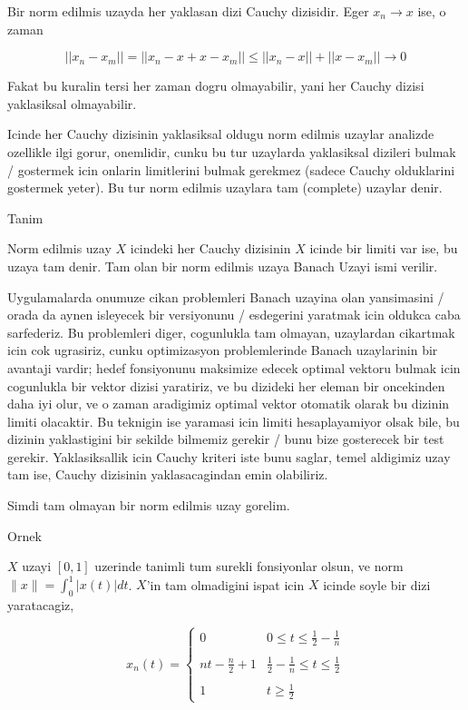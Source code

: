 \documentclass[12pt,fleqn]{article}\usepackage{../common}
\begin{document}
Bir norm edilmis uzayda her yaklasan dizi Cauchy dizisidir. Eger $x_n \to
x$ ise, 
o zaman 

\[ ||x_n - x_m|| = ||x_n -x +x -x_m|| \le 
||x_n - x|| + ||x-x_m|| \to 0
 \]

Fakat bu kuralin tersi her zaman dogru olmayabilir, yani her Cauchy dizisi
yaklasiksal olmayabilir. 

Icinde her Cauchy dizisinin yaklasiksal oldugu norm edilmis uzaylar
analizde ozellikle ilgi gorur, onemlidir, cunku bu tur uzaylarda
yaklasiksal dizileri bulmak / gostermek icin onlarin limitlerini bulmak
gerekmez (sadece Cauchy olduklarini gostermek yeter). Bu tur norm edilmis
uzaylara tam (complete) uzaylar denir.

Tanim

Norm edilmis uzay $X$ icindeki her Cauchy dizisinin $X$ icinde bir limiti
var ise, bu uzaya tam denir. Tam olan bir norm edilmis uzaya Banach Uzayi
ismi verilir. 

Uygulamalarda onumuze cikan problemleri Banach uzayina olan yansimasini /
orada da aynen isleyecek bir versiyonunu / esdegerini yaratmak icin oldukca
caba sarfederiz. Bu problemleri diger, cogunlukla tam olmayan, uzaylardan
cikartmak icin cok ugrasiriz, cunku optimizasyon problemlerinde Banach
uzaylarinin bir avantaji vardir; hedef fonsiyonunu maksimize edecek optimal
vektoru bulmak icin cogunlukla bir vektor dizisi yaratiriz, ve bu dizideki
her eleman bir oncekinden daha iyi olur, ve o zaman aradigimiz optimal
vektor otomatik olarak bu dizinin limiti olacaktir. Bu teknigin ise
yaramasi icin limiti hesaplayamiyor olsak bile, bu dizinin yaklastigini bir
sekilde bilmemiz gerekir / bunu bize gosterecek bir test
gerekir. Yaklasiksallik icin Cauchy kriteri iste bunu saglar, temel
aldigimiz uzay tam ise, Cauchy dizisinin yaklasacagindan emin olabiliriz.

Simdi tam olmayan bir norm edilmis uzay gorelim. 

Ornek

$X$ uzayi $[0,1]$ uzerinde tanimli tum surekli fonsiyonlar olsun, ve norm
$\|x\| = \int_{0}^{1} |x(t)|dt$. $X$'in tam olmadigini ispat icin $X$ icinde soyle bir 
dizi yaratacagiz, 



\[ 
 x_n(t) =
\left\{ \begin{array}{ll}
0 &  0 \le t \le \frac{1}{2} - \frac{1}{n} \\ \\
nt-\frac{n}{2} + 1 &  \frac{1}{2} - \frac{1}{n} \le t \le \frac{1}{2} \\ \\
1 & t \ge \frac{1}{2}
\end{array} \right.
 \]
\end{document}
